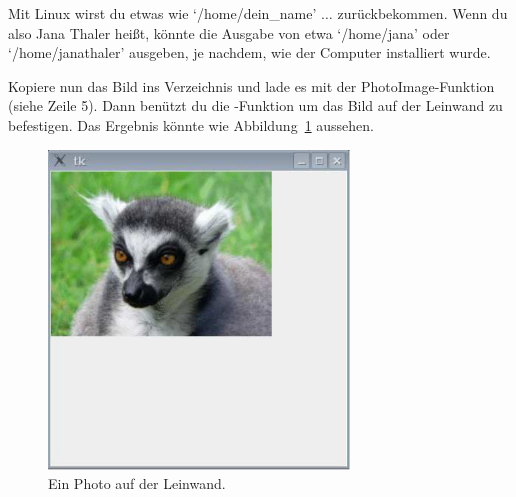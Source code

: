 \begin{LINUX}
Mit Linux wirst du etwas wie `/home/dein\_name' $\ldots$ zurückbekommen. Wenn du also Jana Thaler heißt, könnte die Ausgabe von  etwa `/home/jana' oder `/home/janathaler' ausgeben, je nachdem, wie der Computer installiert wurde.
\end{LINUX}

Kopiere nun das Bild ins Verzeichnis und lade es mit der PhotoImage-Funktion (siehe Zeile 5). Dann benützt du die -Funktion um das Bild auf der Leinwand zu befestigen. Das Ergebnis könnte wie Abbildung~\ref{fig43} aussehen.

\begin{figure}
\begin{center}
\includegraphics[width=80mm]{images/figure43}
\end{center}
\caption{Ein Photo auf der Leinwand.}\label{fig43}
\end{figure}

